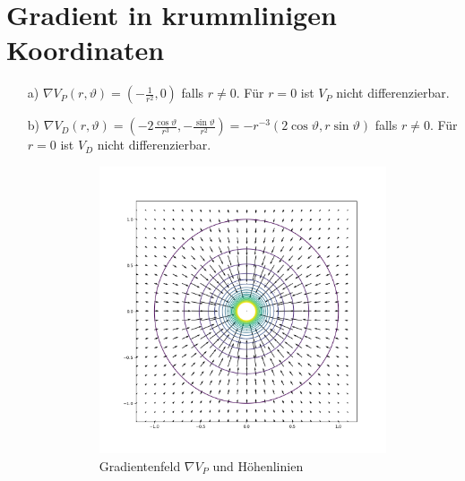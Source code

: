 \documentclass[11pt]{article}
\theoremstyle{plain}
\theoremstyle{definition}
\theoremstyle{remark}
\newcommand{\D}{\displaystyle}
\begin{document}
\section{Gradient in krummlinigen Koordinaten}

\begin{itemize}
\item[a)] 
$\D \nabla V_P (r, \vartheta) = \left(-\frac{1}{r^2}, 0\right)$ falls $ r \neq 0 $. Für $ r=0 $ ist $ V_P $ nicht differenzierbar. 

\item[b)] 
$ \D \nabla V_D (r,\vartheta) = \left( -2 \frac{\cos \vartheta}{r^3} , - \frac{\sin \vartheta}{r^2} \right) = -r^{-3} (2\cos \vartheta,r\sin\vartheta) $ falls $ r \neq 0 $. Für $ r=0 $ ist $ V_D $ nicht differenzierbar.

\begin{figure}[h]
	\begin{subfigure}{0.5\textwidth}
		\includegraphics[width=\linewidth]{VP.png} 
		\caption{Gradientenfeld $\nabla V_P$ und Höhenlinien }
	\end{subfigure}
	\begin{subfigure}{0.5\textwidth}

\end{subfigure}
\end{figure}
\end{itemize}
\end{document}
